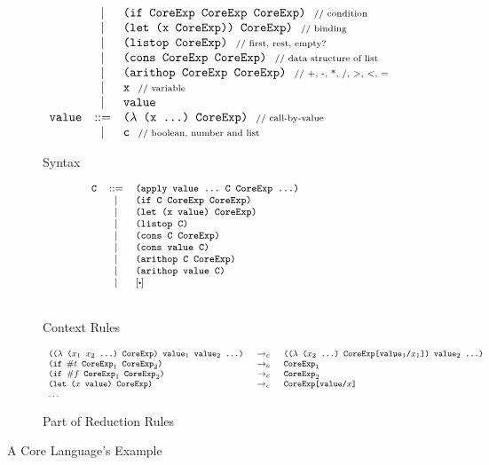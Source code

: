 \begin{figure*}[thb]
\begin{subfigure}{0.45\linewidth}
\[{\begin{array}{lcl}
		&|& \mbox{\tt (if~CoreExp~CoreExp~CoreExp)} ~~\mbox{{\scriptsize // condition}}\\
		&|& \mbox{\tt (let~(x~CoreExp))~CoreExp)} ~~\mbox{{\scriptsize // binding}}\\
		&|& \mbox{\tt (listop~CoreExp)} ~~\mbox{{\scriptsize // first, rest, empty?}}\\
		&|& \mbox{\tt (cons~CoreExp~CoreExp)} ~~\mbox{{\scriptsize // data structure of list}}\\
		&|& \mbox{\tt (arithop~CoreExp~CoreExp)} ~~\mbox{{\scriptsize // +, -, *, /, >, <, =}}\\
		&|& \mbox{\tt x} ~~\mbox{{\scriptsize // variable}}\\
		&|& \mbox{\tt value}\\
		\mbox{\tt value} &::=& \mbox{\tt ($\lambda$~(x~...)~CoreExp)} ~~\mbox{{\scriptsize // call-by-value}}\\
		&|& \mbox{\tt c} ~~\mbox{{\scriptsize // boolean, number and list}}
		\end{array}
}
\]
\caption{Syntax}
\end{subfigure}
\begin{subfigure}{0.5\linewidth}
\[
{\footnotesize
		\begin{array}{lcl}
		\Code{C} &::=& \Code{(apply~value~...~C~CoreExp~...)}\\
		&|& \Code{(if~C~CoreExp~CoreExp)}\\
		&|& \Code{(let~(x~value)~CoreExp)}\\
		&|& \Code{(listop~C)}\\
		&|& \Code{(cons~C~CoreExp)}\\
		&|& \Code{(cons~value~C)}\\
		&|& \Code{(arithop~C~CoreExp)}\\
		&|& \Code{(arithop~value~C)}\\
		&|& [\bigcdot]\\[1.5em]
		\end{array}
}
\]
\caption{Context Rules}
\end{subfigure}

\begin{subfigure}{0.8\linewidth}
	\[
{\footnotesize
		\begin{array}{lcl}
		\texttt{(($\lambda$~($x_1$~$x_2$~...)~CoreExp)~$\mbox{\tt value}_1$~$\mbox{\tt value}_2$~...)} &~\rightarrow_c~& \texttt{(($\lambda$~($x_2$~...)~CoreExp[$\mbox{\tt value}_1$/$x_1$])~$\mbox{\tt value}_2$~...)}\\

		\texttt{(if~$\#t$~$\mbox{\tt CoreExp}_1$~$\mbox{\tt CoreExp}_2$)}&~\rightarrow_c~& \texttt{$\mbox{\tt CoreExp}_1$}\\
		\texttt{(if~$\#f$~$\mbox{\tt CoreExp}_1$~$\mbox{\tt CoreExp}_2$)}&~\rightarrow_c~& \texttt{$\mbox{\tt CoreExp}_2$}\\
		\texttt{(let~($x$~$\mbox{\tt value}$)~CoreExp)}&~\rightarrow_c~&\texttt{CoreExp[\mbox{\tt value}/$x$]}\\
		\ldots&&
		\end{array}
}
\]
	\caption{Part of Reduction Rules}
\end{subfigure}

\caption{A Core Language's Example}
\label{fig:core}
\end{figure*}



